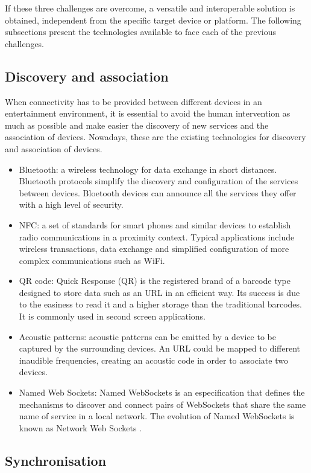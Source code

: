 If these three challenges are overcome, a versatile and interoperable solution is obtained, independent from the specific target device or platform. The following subsections present the technologies available to face each of the previous challenges.

\subsection{Discovery and association}
When connectivity has to be provided between different devices in an entertainment environment, it is essential to avoid the human intervention as much as possible and make easier the discovery of new services and the association of devices. Nowadays, these are the existing technologies for discovery and association of devices.

\begin{itemize}
	\item Bluetooth: a wireless technology for data exchange in short distances. Bluetooth protocols simplify the discovery and configuration of the services between devices. Bloetooth devices can announce all the services they offer with a high level of security.
	\item NFC: a set of standards for smart phones and similar devices to establish radio communications in a proximity context. Typical applications include wireless transactions, data exchange and simplified configuration of more complex communications such as WiFi.
	\item QR code: Quick Response (QR) is the registered brand of a barcode type designed to store data such as an URL in an efficient way. Its success is due to the easiness to read it and a higher storage than the traditional barcodes. It is commonly used in second screen applications.
	\item Acoustic patterns: acoustic patterns can be emitted by a device to be captured by the surrounding devices. An URL could be mapped to different inaudible frequencies, creating an acoustic code in order to associate two devices. 
	\item Named Web Sockets: Named WebSockets \cite{nws} is an especification that defines the mechanisms to discover and connect pairs of WebSockets that share the same name of service in a local network. The evolution of Named WebSockets is known as Network Web Sockets \cite{netWS}.
	
\end{itemize}

\subsection{Synchronisation}


